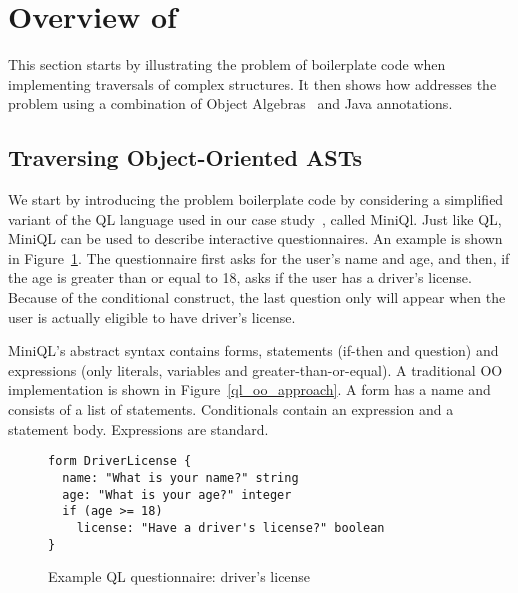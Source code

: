 \section{Overview of \name}\label{subsec:overview}

This section starts by illustrating the problem of boilerplate code when implementing
traversals of complex structures. It then shows how \name addresses
the problem using a combination of Object Algebras~\cite{bruno12oa}
and Java annotations.

\subsection{Traversing Object-Oriented ASTs  }



We start by introducing the problem boilerplate code by considering a simplified variant of the QL language used in our case study~\cite{gouseti14extensible}, called MiniQl.
Just like QL, MiniQL can be used to describe interactive questionnaires. An example is shown in Figure~\ref{driver_license}.
The questionnaire first asks for the user's name and age, and then, if the age is greater than or equal to 18, asks if the user has a driver's license.
Because of the conditional construct, the last question only will appear when the user is actually eligible to have driver's license.

MiniQL's abstract syntax contains forms, statements (if-then and question) and expressions (only literals, variables and greater-than-or-equal).
A traditional OO implementation is shown in Figure~\ref{ql_oo_approach}.
A form has a name and consists of a list of statements.
Conditionals contain an expression and a statement body. Expressions are standard.

\begin{figure}[t]
\nocaptionrule
\begin{lstlisting}[language=ql]
form DriverLicense {
  name: "What is your name?" string
  age: "What is your age?" integer
  if (age >= 18)
    license: "Have a driver's license?" boolean
}
\end{lstlisting}
\caption{Example QL questionnaire: driver's license}
\label{driver_license}
\end{figure}


